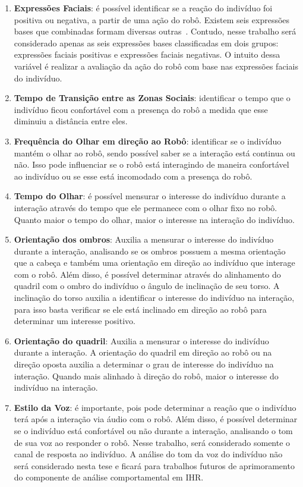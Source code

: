 \begin{enumerate}
	\item \textbf{Expressões Faciais}: é possível identificar se a reação do indivíduo foi positiva ou negativa, a partir de uma ação do robô. Existem seis expressões bases que combinadas formam diversas outras~\cite{bihan:2014}. Contudo, nesse trabalho será considerado apenas as seis expressões bases classificadas em dois grupos: expressões faciais positivas e expressões faciais negativas. O intuito dessa variável é realizar a avaliação da ação do robô com base nas expressões faciais do indivíduo.
	\item \textbf{Tempo de Transição entre as Zonas Sociais}: identificar o tempo que o indivíduo ficou confortável com a presença do robô a medida que esse diminuiu a distância entre eles.
	\item \textbf{Frequência do Olhar em direção ao Robô}: identificar se o indivíduo mantém o olhar ao robô, sendo possível saber se a interação está continua ou não. Isso pode influenciar se o robô está interagindo de maneira confortável ao indivíduo ou se esse está incomodado com a presença do robô.
	\item \textbf{Tempo do Olhar}: é possível mensurar o interesse do indivíduo durante a interação através do tempo que ele permanece com o olhar fixo no robô. Quanto maior o tempo do olhar, maior o interesse na interação do indivíduo.
	\item \textbf{Orientação dos ombros}: Auxilia a mensurar o interesse do indivíduo durante a interação, analisando se os ombros possuem a mesma orientação que a cabeça e também uma orientação em direção ao indivíduo que interage com o robô. Além disso, é possível determinar através do alinhamento do quadril com o ombro do indivíduo o ângulo de inclinação de seu torso. A inclinação do torso auxilia a identificar o interesse do indivíduo na interação, para isso basta verificar se ele está inclinado em direção ao robô para determinar um interesse positivo.
	\item \textbf{Orientação do quadril}: Auxilia a mensurar o interesse do indivíduo durante a interação. A orientação do quadril em direção ao robô ou na direção oposta auxilia a determinar o grau de interesse do indivíduo na interação. Quando mais alinhado à direção do robô, maior o interesse do indivíduo na interação.
	\item \textbf{Estilo da Voz}: é importante, pois pode determinar a reação que o indivíduo terá após a interação via áudio com o robô. Além disso, é possível determinar se o indivíduo está confortável ou não durante a interação, analisando o tom de sua voz ao responder o robô. Nesse trabalho, será considerado somente o canal de resposta ao indivíduo. A análise do tom da voz do indivíduo não será considerado nesta tese e ficará para trabalhos futuros de aprimoramento do componente de análise comportamental em IHR.
\end{enumerate}

